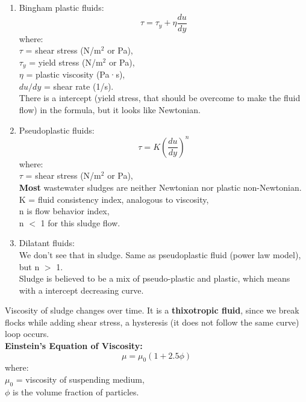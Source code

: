 \documentclass{article}
\numberwithin{equation}{section}
\begin{document}
\begin{enumerate} [start=5]
\begin{enumerate}
    $du/dy$ = shear rate (1/s).\\
    Viscosity is dependent on temperature.\\
    Sludge $\Rightarrow$ mostly not Newtonian but if it is diluted it is Newtonian.
    It is not about thickness, thick fluids can be Newtonian.
    \item Bingham plastic fluids:
    \[
    \tau = \tau_y + \eta \frac{du}{dy}
    \]
    where:\\
    $\tau$ = shear stress (N/m$^2$ or Pa),\\
    $\tau_y$ = yield stress (N/m$^2$ or Pa),\\
    $\eta$ = plastic viscosity (Pa·s),\\
    $du/dy$ = shear rate (1/s).\\
    There is a intercept (yield stress, that should be overcome to make the fluid flow) in the formula, but it looks like Newtonian.
    \item Pseudoplastic fluids:
    \begin{equation}
        \tau = K \left(\frac{du}{dy}\right)^n
        \label{eq:powerlawmodel}
    \end{equation}
    where:\\
    $\tau$ = shear stress (N/m$^2$ or Pa),\\
    \textbf{Most} wastewater sludges are neither Newtonian nor plastic non-Newtonian.\\
    K = fluid consistency index, analogous to viscosity,\\
    n is flow behavior index,\\
    n $<$ 1 for this sludge flow.
    \item Dilatant fluids:\\
    We don't see that in sludge. Same as pseudoplastic fluid (power law model), but n $>$ 1.\\
    Sludge is believed to be a mix of pseudo-plastic and plastic, which means with a intercept decreasing curve.
    \end{enumerate}
Viscosity of sludge changes over time. It is a \textbf{thixotropic fluid}, since we break flocks while adding shear stress, a hysteresis (it does not follow the same curve) loop occurs.\\
\textbf{Einstein's Equation of Viscosity:}
\[
\mu = \mu_0 (1+2.5\phi)
\]
where:\\
$\mu_0$ = viscosity of suspending medium,\\
$\phi$ is the volume fraction of particles.\\

\end{enumerate}
\end{document}
